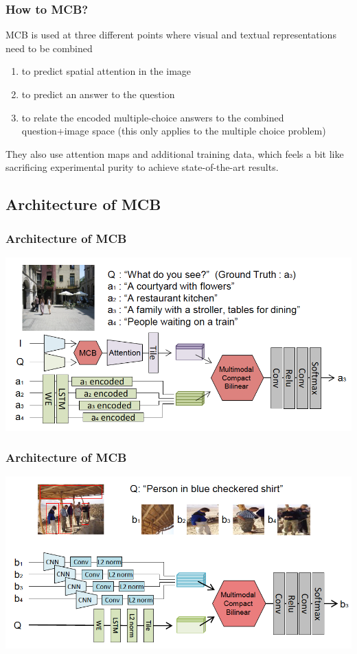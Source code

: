 \documentclass{beamer}
\begin{document}
\begin{frame}
\frametitle{How to MCB?}
MCB is used at three different points where visual and textual representations need to be combined
\begin{enumerate} 
  \item to predict spatial attention in the image 
  \item to predict an answer to the question
  \item to relate the encoded multiple-choice answers to the combined question+image space (this only applies to the multiple choice problem)
  \end{enumerate}  
 
 \vspace{0.3cm}
 
They also use attention maps and additional training data, which feels a bit like sacrificing experimental purity to achieve state-of-the-art results.
\end{frame}

\subsection{Architecture of MCB}
\begin{frame}
\frametitle{Architecture of MCB}
\begin{center}
\includegraphics[scale=0.65]{./images/MCB_Architecture01}
\end{center}
\end{frame}
\begin{frame}
\frametitle{Architecture of MCB}
\begin{center}
\includegraphics[scale=0.65]{./images/MCB_Architecture02}
\end{center}
\end{frame}
\end{document}
